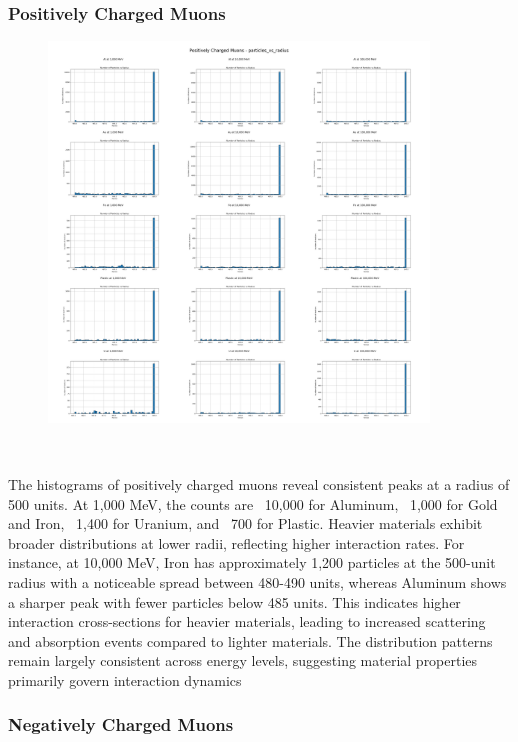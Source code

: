 \documentclass{article}
\begin{document}
\subsubsection{Positively Charged Muons}

\begin{figure}[H]
\centering
\includegraphics[width=0.9\textwidth]{images/Combined Plots/particles_vs_radius_mu+.png}
\end{figure}\

\noindent The histograms of positively charged muons reveal consistent peaks at a radius of 500 units. At 1,000 MeV, the counts are ~10,000 for Aluminum, ~1,000 for Gold and Iron, ~1,400 for Uranium, and ~700 for Plastic. Heavier materials exhibit broader distributions at lower radii, reflecting higher interaction rates. For instance, at 10,000 MeV, Iron has approximately 1,200 particles at the 500-unit radius with a noticeable spread between 480-490 units, whereas Aluminum shows a sharper peak with fewer particles below 485 units. This indicates higher interaction cross-sections for heavier materials, leading to increased scattering and absorption events compared to lighter materials. The distribution patterns remain largely consistent across energy levels, suggesting material properties primarily govern interaction dynamics

\subsubsection{Negatively Charged Muons}
\end{document}

